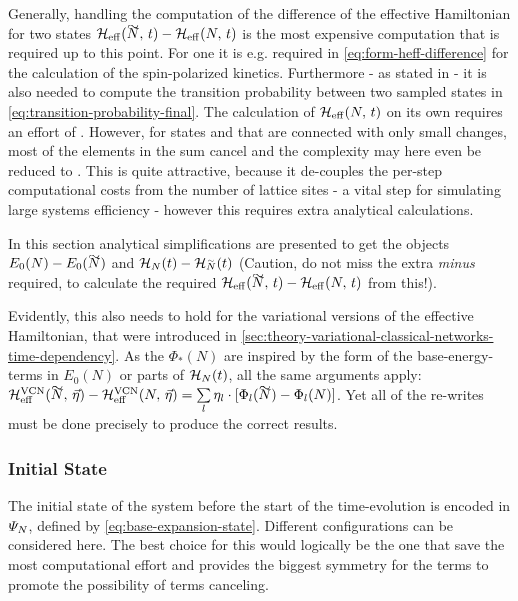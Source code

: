 Generally, handling the computation of the difference of the effective Hamiltonian for two states $\HeffOft[\vphantom{N}\smash{\tilde{N}}]-\HeffOft[N]$ is the most expensive computation that is required up to this point.
For one it is e.g. required in \autoref{eq:form-heff-difference} for the calculation of the spin-polarized kinetics.
Furthermore - as stated in  - it is also needed to compute the transition probability between two sampled states in \autoref{eq:transition-probability-final}.
The calculation of $\HeffOft[N]$ on its own requires an effort of .
However, for states \ketN[N] and  that are connected with only small changes, most of the elements in the sum cancel and the complexity may here even be reduced to .
This is quite attractive, because it de-couples the per-step computational costs from the number of lattice sites - a vital step for simulating large systems efficiency - however this requires extra analytical calculations.

In this section analytical simplifications are presented to get the objects $E_0(N)-E_0(\vphantom{N}\smash{\tilde{N}})$ and $\HNOft - \HNOft[\vphantom{N}\smash{\tilde{N}}]$ (Caution, do not miss the extra \emph{minus} required, to calculate the required $\HeffOft[\vphantom{N}\smash{\tilde{N}}]-\HeffOft[N]$ from this!).

Evidently, this also needs to hold for the variational versions of the effective Hamiltonian, that were introduced in \autoref{sec:theory-variational-classical-networks-time-dependency}.
As the $\Phi_\ast(N)$ are inspired by the form of the base-energy-terms in $E_0(N)$ or parts of $\HNOft$, all the same arguments apply: 
$\Heffvcn{\vphantom{N}\smash{\tilde{N}}}{\vec{\eta}} - \Heffvcn{N}{\vec{\eta}} = \lsum[l] \eta_l \cdot \left[\Phi_l(\vphantom{N}\smash{\tilde{N}}) - \Phi_l(N)\right]$.
Yet all of the re-writes must be done precisely to produce the correct results.

\subsubsection*{Initial State}

The initial state of the system before the start of the time-evolution is encoded in $\psiN$, defined by \autoref{eq:base-expansion-state}. Different configurations can be considered here.
The best choice for this would logically be the one that save the most computational effort and provides the biggest symmetry for the terms to promote the possibility of terms canceling.


